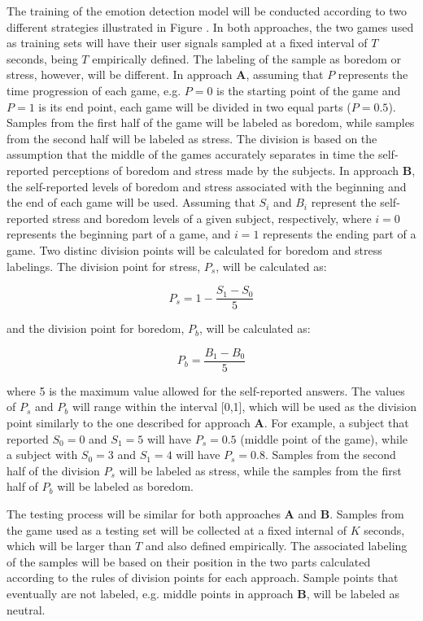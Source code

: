 The training of the emotion detection model will be conducted according to two different strategies illustrated in Figure \label{fig:machine-learning-labeling-approach}. In both approaches, the two games used as training sets will have their user signals sampled at a fixed interval of $T$ seconds, being $T$ empirically defined. The labeling of the sample as boredom or stress, however, will be different. In approach \textbf{A}, assuming that $P$ represents the time progression of each game, e.g. $P=0$ is the starting point of the game and $P=1$ is its end point, each game will be divided in two equal parts ($P=0.5$). Samples from the first half of the game will be labeled as boredom, while samples from the second half will be labeled as stress. The division is based on the assumption that the middle of the games accurately separates in time the self-reported perceptions of boredom and stress made by the subjects. In approach \textbf{B}, the self-reported levels of boredom and stress associated with the beginning and the end of each game will be used. Assuming that $S_i$ and $B_i$ represent the self-reported stress and boredom levels of a given subject, respectively, where $i=0$ represents the beginning part of a game, and $i=1$ represents the ending part of a game. Two distinc division points will be calculated for boredom and stress labelings. The division point for stress, $P_s$, will be calculated as:

\begin{equation}
P_s = 1 - \frac{S_1 - S_0}{5}
\end{equation}

and the division point for boredom, $P_b$, will be calculated as:

\begin{equation}
P_b = \frac{B_1 - B_0}{5}
\end{equation}

where 5 is the maximum value allowed for the self-reported answers. The values of $P_s$ and $P_b$ will range within the interval [0,1], which will be used as the division point similarly to the one described for approach \textbf{A}. For example, a subject that reported $S_0=0$ and $S_1=5$ will have $P_s=0.5$ (middle point of the game), while a subject with $S_0=3$ and $S_1=4$ will have $P_s=0.8$. Samples from the second half of the division $P_s$ will be labeled as stress, while the samples from the first half of $P_b$ will be labeled as boredom.

The testing process will be similar for both approaches \textbf{A} and \textbf{B}. Samples from the game used as a testing set will be collected at a fixed internal of $K$ seconds, which will be larger than $T$ and also defined empirically. The associated labeling of the samples will be based on their position in the two parts calculated according to the rules of division points for each approach. Sample points that eventually are not labeled, e.g. middle points in approach \textbf{B}, will be labeled as neutral.

